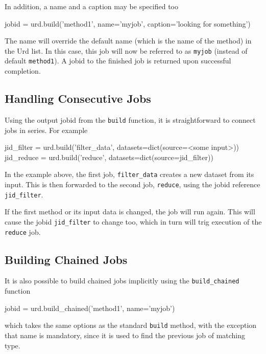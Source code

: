 In addition, a name and a caption may be specified too
\begin{python}
  jobid = urd.build('method1', name='myjob', caption='looking for something')
\end{python}
The name will override the default name (which is the name of the method) in the Urd list.  In this case,
this job will now be referred to as \texttt{myjob} (instead of default
\texttt{method1}).  A jobid to the finished job is returned upon
successful completion.



\subsection{Handling Consecutive Jobs}
Using the output jobid from the \texttt{build} function, it is
straightforward to connect jobs in series.  For example
\begin{python}
  jid_filter = urd.build('filter_data', datasets=dict(source=<some input>))
  jid_reduce = urd.build('reduce', datasets=dict(source=jid_filter))
\end{python}
In the example above, the first job, \texttt{filter\_data} creates a
new dataset from its input.  This is then forwarded to the second job,
\texttt{reduce}, using the jobid reference \texttt{jid\_filter}.

If the first method or its input data is changed, the job will run
again.  This will cause the jobid \texttt{jid\_filter} to change too,
which in turn will trig execution of the \texttt{reduce} job.



\subsection{Building Chained Jobs}
It is also possible to build chained jobs implicitly using the
\texttt{build\_chained} function
\begin{python}
  jobid = urd.build_chained('method1', name='myjob')
\end{python}
which takes the same options as the standard \texttt{build} method,
with the exception that name is mandatory, since it is used to find
the previous job of matching type.

